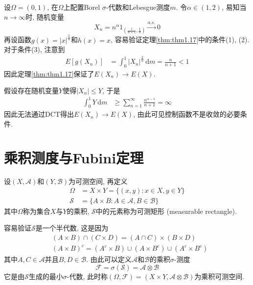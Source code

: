 \documentclass[cn, 12pt, math=mtpro2, bibstyle=apa, blue, twocol]{elegantbook}
\newcommand{\F}{\mathcal{F}}
\newcommand{\SE}{\mathcal{S}}
\begin{document}
 \begin{example}
 设$\Omega=(0,1)$, 在$\Omega$上配置Borel $\sigma$-代数和Lebesgue测度$m$. 令$\alpha\in (1,2)$, 易知当$n\to\infty$时, 随机变量
 $$X_n=n^\alpha 1_{\left(\frac{1}{n+1},\frac{1}{n}\right)}\xrightarrow{a.s.}0$$
 再设函数$g(x)=|x|^{\frac{2}{\alpha}}$和$h(x)=x$, 容易验证定理\ref{thm:thm1.17}中的条件(1), (2). 对于条件(3), 注意到
 \begin{align*}
 E[g(X_n)]&=\int_{0}^{1}|X_n|^{\frac{2}{\alpha}}\,\text{d}m=\frac{n}{n+1}<1
 \end{align*}
 因此定理\ref{thm:thm1.17}保证了$E(X_n)\to E(X)$.

 假设存在随机变量$Y$使得$|X_n|\leq Y$, 于是
 \begin{align*}
 \int_{0}^{1}Y\,\text{d}m&\geq \sum_{n=1}^{\infty}\frac{n^{\alpha-1}}{n+1}=\infty
 \end{align*}
 因此无法通过DCT得出$E(X_n)\to E(X)$, 由此可见控制函数不是收敛的必要条件.
 \end{example}

\section{乘积测度与Fubini定理}
\begin{definition}
   设$(X,\mathcal{A})$和$(Y,\mathcal{B})$为可测空间, 再定义
   \begin{align*}
   \Omega&=X\times Y=\{(x,y): x\in X, y\in Y\} \\
   \SE&=\{A\times B:A\in\mathcal{A}, B\in\mathcal{B}\}
   \end{align*}
   其中$\Omega$称为集合$X$与$Y$的乘积, $\SE$中的元素称为可测矩形 (measurable rectangle).
\end{definition}

   容易验证$\SE$是一个半代数, 这是因为
   \begin{align*}
   &(A\times B)\cap (C\times D)=(A\cap C)\times (B\times D) \\
   &(A\times B)^c=(A^c\times B)\cup (A\times B^c)\cup (A^c\times B^c)
   \end{align*}
   其中$A,C\in\mathcal{A}$并且$B,D\in\mathcal{B}$. 由此可以定义$\mathcal{A}$和$\mathcal{B}$的乘积$\sigma$-测度
   $$\F=\sigma(\SE)=\mathcal{A}\otimes\mathcal{B}$$
   它是由$\SE$生成的最小$\sigma$-代数, 此时称$(\Omega,\F)=(X\times Y, \mathcal{A}\otimes \mathcal{B})$为乘积可测空间.
\end{document}
